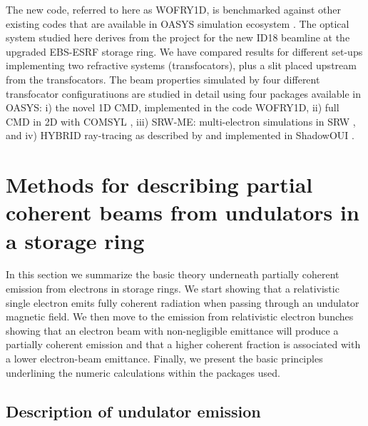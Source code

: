 \documentclass{iucr}              %
\begin{document}
The new code, referred to here as WOFRY1D, is benchmarked against other existing codes that are available in OASYS simulation ecosystem \cite{codeOASYS}. The optical system studied here derives from the project for the new ID18 beamline at the upgraded EBS-ESRF storage ring. We have compared results for different set-ups implementing two refractive systems (transfocators), plus a slit placed upstream from the transfocators. The beam properties simulated by four different transfocator configuratiuons are studied in detail using four packages available in OASYS: i) the novel 1D CMD, implemented in the code WOFRY1D, ii) full CMD in 2D with COMSYL \cite{codeCOMSYL}, iii) SRW-ME: multi-electron simulations in SRW \cite{codeSRW}, and iv) HYBRID ray-tracing as described by  and implemented in ShadowOUI \cite{codeSHADOWOUI}.

\section{Methods for describing partial coherent beams from undulators in a storage ring}\label{sec:part_coh}

In this section we summarize the basic theory underneath partially coherent emission from electrons in storage rings. We start showing that a relativistic single electron emits fully coherent radiation when passing through an undulator magnetic field. We then move to the emission from relativistic electron bunches showing that an electron beam with non-negligible emittance will produce a partially coherent emission and that a higher coherent fraction is associated with a lower electron-beam emittance. Finally, we present the basic principles underlining the numeric calculations within the packages used.


\subsection{Description of undulator emission}
\label{sec:undulator}
\end{document}
